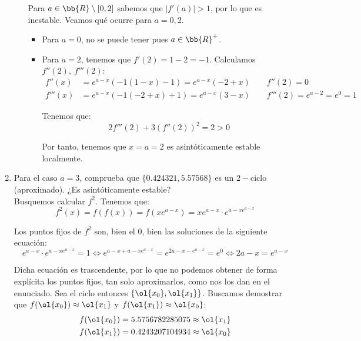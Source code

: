 \begin{ejercicio}
\begin{enumerate}
\begin{itemize}
            Para $a\in \bb{R}\setminus [0,2]$ sabemos que $|f'(a)|>1$, por lo que es inestable. Veamos qué ocurre para $a=0,2$.
            \begin{itemize}
                \item Para $a=0$, no se puede tener pues $a\in \bb{R}^+$.
                \item Para $a=2$, tenemos que $f'(2)=1-2=-1$. Calculamos $f''(2),~f'''(2)$:
                \begin{align*}
                    f''(x)&=e^{a-x}(-1(1-x) -1)=e^{a-x}(-2+x) \qquad f''(2)=0\\
                    f'''(x)&=e^{a-x}(-1(-2+x) +1)=e^{a-x}(3-x) \qquad f'''(2)=e^{a-2} = e^0 = 1
                \end{align*}

                Tenemos que:
                \begin{equation*}
                    2f'''(2) + 3(f''(2))^2 = 2 > 0
                \end{equation*}

                Por tanto, tenemos que $x=a=2$ es asintóticamente estable localmente. 
            \end{itemize}
        \end{itemize}
        
        \item Para el caso $a = 3$, comprueba que $\{0.424321, 5.57568\}$ es un $2-$ciclo (aproximado). ¿Es asintóticamente estable?\\

        Busquemos calcular $f^2$. Tenemos que:
        \begin{equation*}
            f^2(x) = f(f(x)) = f(xe^{a-x}) = xe^{a-x}\cdot e^{a-xe^{a-x}}
        \end{equation*}

        Los puntos fijos de $f^2$ son, bien el $0$, bien las soluciones de la siguiente ecuación:
        \begin{equation*}
            e^{a-x}\cdot e^{a-xe^{a-x}} = 1 \Longleftrightarrow
            e^{a-x + a-xe^{a-x}} = e^{2a-x-e^{a-x}} = e^0\Longleftrightarrow
            2a-x=e^{a-x}
        \end{equation*}

        Dicha ecuación es trascendente, por lo que no podemos obtener de forma explícita los puntos fijos, tan solo aproximarlos, como nos los dan en el enunciado. Sea el ciclo entonces $\{\ol{x_0}, \ol{x_1}\}$. Buscamos demostrar que $f(\ol{x_0})\approx \ol{x_1}$ y $f(\ol{x_1})\approx \ol{x_0}$:
        \begin{align*}
            f(\ol{x_0}) &= 5.5756782285075 \approx \ol{x_1}\\
            f(\ol{x_1}) &= 0.4243207104934 \approx \ol{x_0}\\
        \end{align*}


\end{enumerate}
\end{ejercicio}
